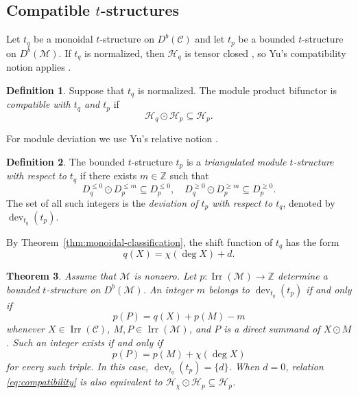 \documentclass[11pt]{amsart}
\newcommand{\C}{\mathcal C}
\newcommand{\M}{\mathcal M}
\newcommand{\Hh}{\mathcal H}
\newcommand{\Irr}{\operatorname{Irr}}
\newcommand{\dev}{\operatorname{dev}}
\newtheorem{theorem}{Theorem}[section]
\theoremstyle{definition}
\newtheorem{definition}[theorem]{Definition}
\theoremstyle{remark}
\theoremstyle{plain}
\begin{document}
\subsection{Compatible \texorpdfstring{$t$}{t}-structures}\label{subsec:compatible-t-structures}

Let $t_q$ be a monoidal $t$-structure on $D^b(\C)$ and let $t_p$ be a bounded $t$-structure on $D^b(\M)$. If $t_q$ is normalized, then $\Hh_q$ is tensor closed \cite[Proposition~2.13]{XuZheng}, so Yu's compatibility notion applies \cite[Definition~3.1]{Yu}.

\begin{definition}\label{def:compatible-module-product}
Suppose that $t_q$ is normalized. The module product bifunctor is \emph{compatible with $t_q$ and $t_p$} if
\[
\Hh_q\odot\Hh_p\subseteq\Hh_p.
\]
\end{definition}

For module deviation we use Yu's relative notion \cite[Definition~3.4]{Yu}.

\begin{definition}\label{def:triangulated-module-t}
The bounded $t$-structure $t_p$ is a \emph{triangulated module $t$-structure with respect to $t_q$} if there exists $m\in\mathbb Z$ such that
\begin{equation}\label{eq:module-deviation}
D_q^{\leq0}\odot D_p^{\leq m}\subseteq D_p^{\leq0},\quad D_q^{\geq0}\odot D_p^{\geq m}\subseteq D_p^{\geq0}.
\end{equation}
The set of all such integers is the \emph{deviation of $t_p$ with respect to $t_q$}, denoted by $\dev_{t_q}(t_p)$.
\end{definition}

By Theorem~\ref{thm:monoidal-classification}, the shift function of $t_q$ has the form
\begin{equation}\label{eq:ambient-shift}
q(X)=\chi(\deg X)+d.
\end{equation}

\begin{theorem}\label{thm:module-compatibility}
Assume that $\M$ is nonzero. Let $p:\Irr(\M)\to\mathbb Z$ determine a bounded $t$-structure on $D^b(\M)$. An integer $m$ belongs to $\dev_{t_q}(t_p)$ if and only if
\begin{equation}\label{eq:compatibility-general}
p(P)=q(X)+p(M)-m
\end{equation}
whenever $X\in\Irr(\C)$, $M,P\in\Irr(\M)$, and $P$ is a direct summand of $X\odot M$. Such an integer exists if and only if
\begin{equation}\label{eq:compatibility}
p(P)=p(M)+\chi(\deg X)
\end{equation}
for every such triple. In this case, $\dev_{t_q}(t_p)=\{d\}$. When $d=0$, relation \eqref{eq:compatibility} is also equivalent to $\Hh_\chi\odot\Hh_p\subseteq\Hh_p$.
\end{theorem}
\end{document}
